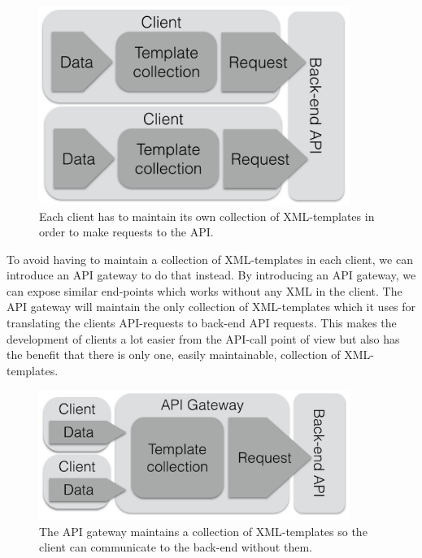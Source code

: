 \documentclass{cslthse-msc}
\begin{document}
\begin{figure}[H]
  \centering
    \begin{center}
      \includegraphics[width=0.9\textwidth]{images/client_templates.png}
    \end{center}
  \caption{Each client has to maintain its own collection of XML-templates in order to make requests to the API.}
\end{figure}

To avoid having to maintain a collection of XML-templates in each client, we can introduce an API gateway to do that instead. By introducing an API gateway, we can expose similar end-points which works without any XML in the client. The API gateway will maintain the only collection of XML-templates which it uses for translating the clients API-requests to back-end API requests. This makes the development of clients a lot easier from the API-call point of view but also has the benefit that there is only one, easily maintainable, collection of XML-templates.

\begin{figure}[H]
  \centering
    \begin{center}
      \includegraphics[width=0.9\textwidth]{images/gateway_templates.png}
    \end{center}
  \caption{The API gateway maintains a collection of XML-templates so the client can communicate to the back-end without them.}
\end{figure}
\end{document}
